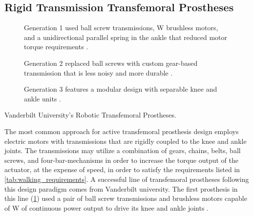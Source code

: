 \subsection{Rigid Transmission Transfemoral
Prostheses}\label{sec:back_rigid_trans} 
\begin{marginfigure}
    \centering
	\begin{subfigure}[t]{\linewidth}
    	\centering
        \caption{Generation 1 used ball screw transmissions, \unit[200]{W}
        brushless motors, and a unidirectional parallel spring in the ankle that
        reduced motor torque requirements \citep{sup2009preliminary}.}
        \label{fig:vanderbilt_gen_1}
	\end{subfigure}

	\begin{subfigure}[t]{\linewidth}
    	\centering
        \caption{Generation 2 replaced ball screws with custom gear-based
        transmission that is less noisy and more durable
        \citep{lawson2013control}.}
        \label{fig:vanderbilt_gen_2}
	\end{subfigure}

	\begin{subfigure}[t]{\linewidth}
    	\centering
        \caption{Generation 3 features a modular design with separable knee and
        ankle units \citep{lawson2014robotic}.}
        \label{fig:vanderbilt_gen_3}
	\end{subfigure}
    \caption{Vanderbilt University's Robotic Transfemoral Prostheses.}
    \label{fig:vanderbilt_prostheses}
\end{marginfigure}

The most common approach for active transfemoral prosthesis design employs
electric motors with transmissions that are rigidly coupled to the knee and
ankle joints.  The transmissions may utilize a combination of gears, chains,
belts, ball screws, and four-bar-mechanisms in order to increase the torque
output of the actuator, at the expense of speed, in order to satisfy the
requirements listed in \cref{tab:walking_requirements}. A successful line of
transfemoral prostheses following this design paradigm comes from Vanderbilt
university. The first prosthesis in this line (\cref{fig:vanderbilt_gen_1})
used a pair of ball screw transmissions and brushless motors capable of
\unit[200]{W} of continuous power output to drive its knee and ankle joints
\citep{sup2009preliminary}. 

